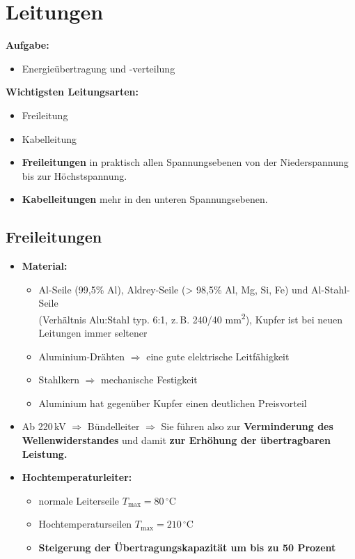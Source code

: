 \section{Leitungen}

\textbf{Aufgabe:}
\begin{itemize}
    \item  Energieübertragung und -verteilung\\
\end{itemize}

\textbf{Wichtigsten Leitungsarten:}
\begin{itemize}
    \item Freileitung
    \item Kabelleitung
    \item \textbf{Freileitungen} in praktisch allen Spannungsebenen von der Niederspannung bis zur Höchstspannung.
    \item \textbf{Kabelleitungen} mehr in den unteren Spannungsebenen.
\end{itemize}


\subsection{Freileitungen}

\begin{itemize}
    \item \textbf{Material:}
    \begin{itemize}
        \item Al-Seile (99{,}5\% Al), Aldrey-Seile (> 98{,}5\% Al, Mg, Si, Fe) und Al-Stahl-Seile\\ 
        (Verhältnis Alu:Stahl typ. 6:1, z.\,B. 240/40 mm\textsuperscript{2}), Kupfer ist bei neuen Leitungen immer seltener
        \item Aluminium-Drähten $\Rightarrow$ eine gute elektrische Leitfähigkeit
        \item Stahlkern $\Rightarrow$ mechanische Festigkeit
        \item Aluminium hat gegenüber Kupfer einen deutlichen Preisvorteil
    \end{itemize}

    \item Ab 220\,kV $\Rightarrow$ Bündelleiter $\Rightarrow$ Sie führen also zur 
    \textbf{Verminderung des Wellenwiderstandes} und damit 
    \textbf{zur Erhöhung der übertragbaren Leistung.}

    \item \textbf{Hochtemperaturleiter:}
    \begin{itemize}
        \item normale Leiterseile $T_{\text{max}} = 80\,^{\circ}\mathrm{C}$
        \item Hochtemperaturseilen $T_{\text{max}} = 210\,^{\circ}\mathrm{C}$
        \item \textbf{Steigerung der Übertragungskapazität um bis zu 50 Prozent}
    \end{itemize}
\end{itemize}


